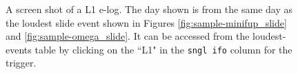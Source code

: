 \begin{figure}[p]
\label{fig:sample-elog-slide}
\begin{center}
\end{center}
\caption{A screen shot of a L1 e-log. The day shown is from the same day as the loudest slide event shown in Figures \ref{fig:sample-minifup_slide} and \ref{fig:sample-omega_slide}. It can be accessed from the loudest-events table by clicking on the ``L1" in the \texttt{sngl ifo} column for the trigger.}
\end{figure}

